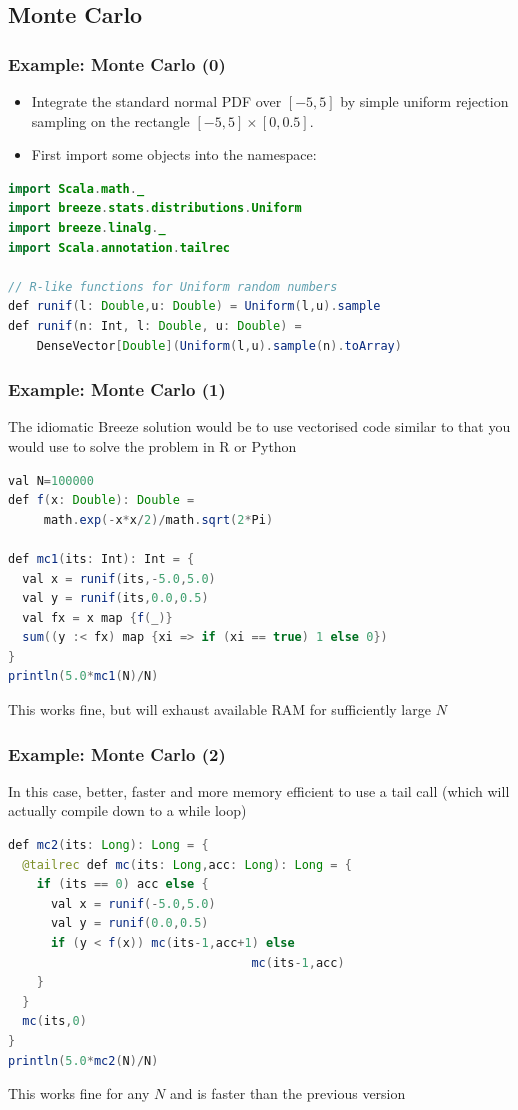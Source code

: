 \documentclass[mathserif,handout]{beamer}
\begin{document}
\subsection{Monte Carlo}

\begin{frame}[fragile]
\frametitle{Example: Monte Carlo (0)}
\begin{itemize}
\item Integrate the standard normal PDF over $[-5,5]$ by simple uniform rejection sampling on the rectangle $[-5,5]\times[0,0.5]$.
\item First import some objects into the namespace:
\end{itemize}
{\scriptsize
\begin{lstlisting}[language=java]
import Scala.math._
import breeze.stats.distributions.Uniform
import breeze.linalg._
import Scala.annotation.tailrec

// R-like functions for Uniform random numbers
def runif(l: Double,u: Double) = Uniform(l,u).sample
def runif(n: Int, l: Double, u: Double) = 
    DenseVector[Double](Uniform(l,u).sample(n).toArray)
\end{lstlisting}} 
\end{frame}

\begin{frame}[fragile]
\frametitle{Example: Monte Carlo (1)}
The idiomatic Breeze solution would be to use vectorised code similar to that you would use to solve the problem in R or Python
{\small
\begin{lstlisting}[language=java]
val N=100000
def f(x: Double): Double = 
     math.exp(-x*x/2)/math.sqrt(2*Pi)

def mc1(its: Int): Int = {
  val x = runif(its,-5.0,5.0)
  val y = runif(its,0.0,0.5)
  val fx = x map {f(_)}
  sum((y :< fx) map {xi => if (xi == true) 1 else 0})
}
println(5.0*mc1(N)/N)
\end{lstlisting}}
This works fine, but will exhaust available RAM for sufficiently large $N$
\end{frame}

\begin{frame}[fragile]
\frametitle{Example: Monte Carlo (2)}
In this case, better, faster and more memory efficient to use a tail call (which will actually compile down to a while loop)
{\small
\begin{lstlisting}[language=java]
def mc2(its: Long): Long = {
  @tailrec def mc(its: Long,acc: Long): Long = {
    if (its == 0) acc else {
      val x = runif(-5.0,5.0)
      val y = runif(0.0,0.5)
      if (y < f(x)) mc(its-1,acc+1) else 
                                  mc(its-1,acc)
    }  
  }
  mc(its,0)
}
println(5.0*mc2(N)/N)
\end{lstlisting}}
This works fine for any $N$ and is faster than the previous version
\end{frame}
\end{document}
